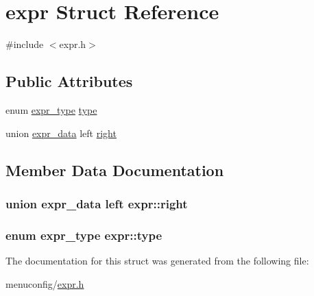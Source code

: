 \hypertarget{structexpr}{\section{expr Struct Reference}
\label{structexpr}
}


{\ttfamily \#include $<$expr.\-h$>$}

\subsection*{Public Attributes}
\begin{DoxyCompactItemize}
\item 
enum \hyperlink{expr_8h_a42f022cdf0b8313a80f367d2739b9c19}{expr\-\_\-type} \hyperlink{structexpr_a09ff299f23d066c20139cc2c5cd89e08}{type}
\item 
union \hyperlink{unionexpr__data}{expr\-\_\-data} left \hyperlink{structexpr_aab133b5f3362a63c1f30fb367ca786a8}{right}
\end{DoxyCompactItemize}


\subsection{Member Data Documentation}
\hypertarget{structexpr_aab133b5f3362a63c1f30fb367ca786a8}{
\subsubsection[{right}]{\setlength{\rightskip}{0pt plus 5cm}union {\bf expr\-\_\-data} left expr\-::right}}\label{structexpr_aab133b5f3362a63c1f30fb367ca786a8}
\hypertarget{structexpr_a09ff299f23d066c20139cc2c5cd89e08}{
\subsubsection[{type}]{\setlength{\rightskip}{0pt plus 5cm}enum {\bf expr\-\_\-type} expr\-::type}}\label{structexpr_a09ff299f23d066c20139cc2c5cd89e08}


The documentation for this struct was generated from the following file\-:\begin{DoxyCompactItemize}
\item 
menuconfig/\hyperlink{expr_8h}{expr.\-h}\end{DoxyCompactItemize}
